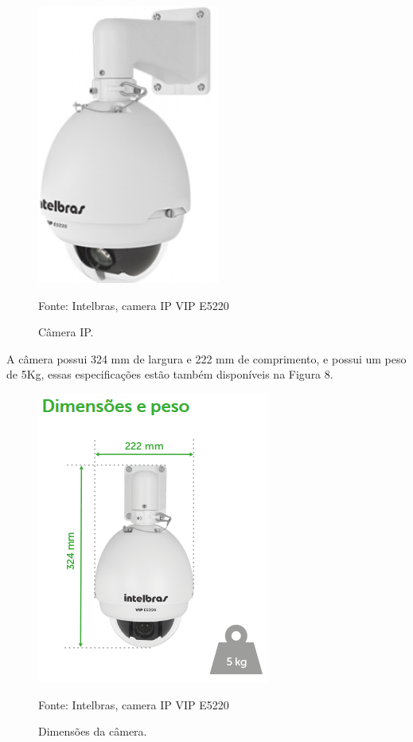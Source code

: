 \begin{itemize}
\begin{itemize}
	\begin{figure}[H]
	 \centering
	\label{Câmera IP}
	 \includegraphics[keepaspectratio=true,scale=0.8]{monitoramento/7.png}
	 \caption{Câmera IP.}
	 \small{Fonte: Intelbras, camera IP VIP E5220}
	\end{figure}
	
	A câmera possui  324 mm de largura e 222 mm de comprimento, e possui um peso de 5Kg, essas especificações estão também  disponíveis  na Figura 8.

	\begin{figure}[H]
	 \centering
	\label{Dimensões da câmera}
	 \includegraphics[keepaspectratio=true,scale=0.8]{monitoramento/8.png}
	 \caption{Dimensões da câmera.}
	 \small{Fonte: Intelbras, camera IP VIP E5220}
	\end{figure}
		

\end{itemize}
\end{itemize}
